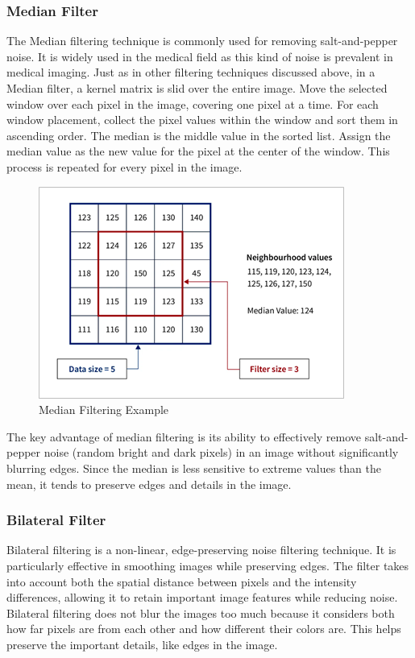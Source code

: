 \documentclass[10pt]{article}
\begin{document}
\begin{multicols}{2}
\subsubsection{Median Filter}
The Median filtering technique is commonly used for removing salt-and-pepper noise. It is widely used in the medical field as this kind of noise is prevalent in medical imaging.
\newline \newline
Just as in other filtering techniques discussed above, in a Median filter, a kernel matrix is slid over the entire image. Move the selected window over each pixel in the image, covering one pixel at a time. For each window placement, collect the pixel values within the window and sort them in ascending order. The median is the middle value in the sorted list. Assign the median value as the new value for the pixel at the center of the window. This process is repeated for every pixel in the image.
\begin{figure}[H]
    \centering
    \includegraphics[width=0.7\linewidth]{Images/Week 3/mediabn-kernel.png}
    \caption{Median Filtering Example}
\end{figure}
The key advantage of median filtering is its ability to effectively remove salt-and-pepper noise (random bright and dark pixels) in an image without significantly blurring edges. Since the median is less sensitive to extreme values than the mean, it tends to preserve edges and details in the image.

\subsubsection{Bilateral Filter}
Bilateral filtering is a non-linear, edge-preserving noise filtering technique. It is particularly effective in smoothing images while preserving edges. The filter takes into account both the spatial distance between pixels and the intensity differences, allowing it to retain important image features while reducing noise.
\newline \newline
Bilateral filtering does not blur the images too much because it considers both how far pixels are from each other and how different their colors are. This helps preserve the important details, like edges in the image.


\end{multicols}
\end{document}
